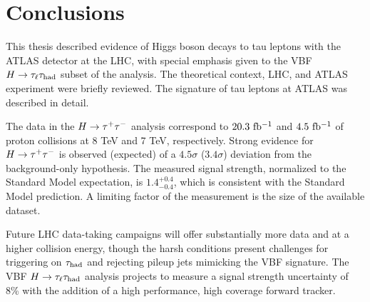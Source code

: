 \chapter[Conclusions][Conclusions]{Conclusions}
\label{chap:conclusion}

This thesis described evidence of Higgs boson decays to tau leptons with the ATLAS detector at the LHC, with special emphasis given to the VBF $H\rightarrow\tau_\ell\tau_\text{had}$ subset of the analysis. The theoretical context, LHC, and ATLAS experiment were briefly reviewed. The signature of tau leptons at ATLAS was described in detail.

The data in the ${H\rightarrow \tau^{+}\tau^{-}}$ analysis correspond to $20.3\ \mbox{fb$^{-1}$}$ and $4.5\ \mbox{fb$^{-1}$}$ of proton collisions at 8 TeV and 7 TeV, respectively. Strong evidence for ${H\rightarrow \tau^{+}\tau^{-}}$ is observed (expected) of a $4.5\sigma$ ($3.4\sigma$) deviation from the background-only hypothesis. The measured signal strength, normalized to the Standard Model expectation, is $1.4^{+0.4}_{-0.4}$, which is consistent with the Standard Model prediction. A limiting factor of the measurement is the size of the available dataset.

Future LHC data-taking campaigns will offer substantially more data and at a higher collision energy, though the harsh conditions present challenges for triggering on $\tau_\text{had}$ and rejecting pileup jets mimicking the VBF signature. The VBF $H\rightarrow\tau_\ell\tau_\text{had}$ analysis projects to measure a signal strength uncertainty of 8\% with the addition of a high performance, high coverage forward tracker.





